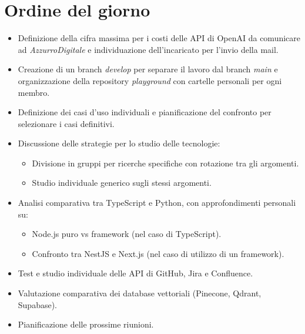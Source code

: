 

\section{Ordine del giorno}

\begin{itemize}
    \item Definizione della cifra massima per i costi delle API di OpenAI da comunicare ad \emph{AzzurroDigitale} e individuazione dell'incaricato per l'invio della mail.
    \item Creazione di un branch \emph{develop} per separare il lavoro dal branch \emph{main} e organizzazione della repository \emph{playground} con cartelle personali per ogni membro.
    \item Definizione dei casi d'uso individuali e pianificazione del confronto per selezionare i casi definitivi.
    \item Discussione delle strategie per lo studio delle tecnologie:
    \begin{itemize}
        \item Divisione in gruppi per ricerche specifiche con rotazione tra gli argomenti.
        \item Studio individuale generico sugli stessi argomenti.
    \end{itemize}
    \item Analisi comparativa tra TypeScript e Python, con approfondimenti personali su:
    \begin{itemize}
        \item Node.js puro vs framework (nel caso di TypeScript).
        \item Confronto tra NestJS e Next.js (nel caso di utilizzo di un framework).
    \end{itemize}
    \item Test e studio individuale delle API di GitHub, Jira e Confluence.
    \item Valutazione comparativa dei database vettoriali (Pinecone, Qdrant, Supabase).
    \item Pianificazione delle prossime riunioni.
\end{itemize}